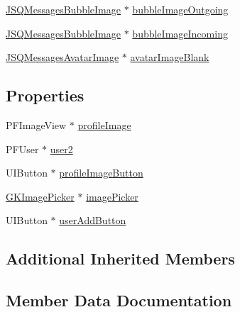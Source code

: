 \begin{DoxyCompactItemize}
\item 
\hyperlink{interface_j_s_q_messages_bubble_image}{J\+S\+Q\+Messages\+Bubble\+Image} $\ast$ \hyperlink{category_e_s_chat_view_07_08_aa43723a95f43553e6d1fa6667a3ddb12}{bubble\+Image\+Outgoing}
\item 
\hyperlink{interface_j_s_q_messages_bubble_image}{J\+S\+Q\+Messages\+Bubble\+Image} $\ast$ \hyperlink{category_e_s_chat_view_07_08_a57710c9690a5c30d8eaeba1cc1bc0945}{bubble\+Image\+Incoming}
\item 
\hyperlink{interface_j_s_q_messages_avatar_image}{J\+S\+Q\+Messages\+Avatar\+Image} $\ast$ \hyperlink{category_e_s_chat_view_07_08_a4964fae6aa4ca1b993424aa349b6efc4}{avatar\+Image\+Blank}
\end{DoxyCompactItemize}
\subsection*{Properties}
\begin{DoxyCompactItemize}
\item 
P\+F\+Image\+View $\ast$ \hyperlink{category_e_s_chat_view_07_08_ae3aef282d138342e0435a36d87ff7cdf}{profile\+Image}
\item 
P\+F\+User $\ast$ \hyperlink{category_e_s_chat_view_07_08_a0864ebca557071365e5f35e30129fec5}{user2}
\item 
U\+I\+Button $\ast$ \hyperlink{category_e_s_chat_view_07_08_a25a71b1a985e2393e255845bed75a80a}{profile\+Image\+Button}
\item 
\hyperlink{interface_g_k_image_picker}{G\+K\+Image\+Picker} $\ast$ \hyperlink{category_e_s_chat_view_07_08_a735277762079544c5eae6640a3b235eb}{image\+Picker}
\item 
U\+I\+Button $\ast$ \hyperlink{category_e_s_chat_view_07_08_a7e7807bda5aa1ad964614862687c0059}{user\+Add\+Button}
\end{DoxyCompactItemize}
\subsection*{Additional Inherited Members}


\subsection{Member Data Documentation}
\hypertarget{category_e_s_chat_view_07_08_a4964fae6aa4ca1b993424aa349b6efc4}{}
